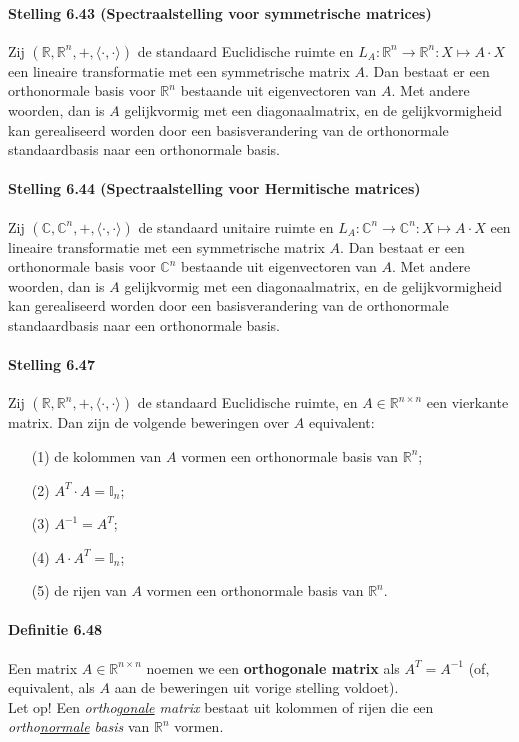 \documentclass[11pt,oneside,a4paper]{article}
\begin{document}
	\paragraph{Stelling 6.43 (Spectraalstelling voor symmetrische matrices)}
		Zij $(\mathbb{R},\mathbb{R}^n,+, \langle \cdot , \cdot \rangle)$ de standaard Euclidische ruimte en $L_A: \mathbb{R}^n \to \mathbb{R}^n: X \mapsto A \cdot X$ een lineaire transformatie met een symmetrische matrix $A$. Dan bestaat er een orthonormale basis voor $\mathbb{R}^n$ bestaande uit eigenvectoren van $A$. Met andere woorden, dan is $A$ gelijkvormig met een diagonaalmatrix, en de gelijkvormigheid kan gerealiseerd worden door een basisverandering van de orthonormale standaardbasis naar een orthonormale basis.
	\paragraph{Stelling 6.44 (Spectraalstelling voor Hermitische matrices)}
		Zij \newline $(\mathbb{C},\mathbb{C}^n,+, \langle \cdot , \cdot \rangle)$ de standaard unitaire ruimte en $L_A: \mathbb{C}^n \to \mathbb{C}^n: X \mapsto A \cdot X$ een lineaire transformatie met een symmetrische matrix $A$. Dan bestaat er een orthonormale basis voor $\mathbb{C}^n$ bestaande uit eigenvectoren van $A$. Met andere woorden, dan is $A$ gelijkvormig met een diagonaalmatrix, en de gelijkvormigheid kan gerealiseerd worden door een basisverandering van de orthonormale standaardbasis naar een orthonormale basis.
	\paragraph{Stelling 6.47}	
		Zij $(\mathbb{R},\mathbb{R}^n,+, \langle \cdot , \cdot \rangle)$ de standaard Euclidische ruimte, en $A \in \mathbb{R}^{n\times n}$ een vierkante matrix. Dan zijn de volgende beweringen over $A$ equivalent:
		\begin{itemize}
			\item[(1)] de kolommen van $A$ vormen een orthonormale basis van $\mathbb{R}^n$;
			\item[(2)] $A^T \cdot A = \mathbb{I}_n$;
			\item[(3)] $A^{-1}= A^T$;
			\item[(4)] $A \cdot A^T = \mathbb{I}_n$;
			\item[(5)] de rijen van $A$ vormen een orthonormale basis van $\mathbb{R}^n$.
		\end{itemize}
	\paragraph{Definitie 6.48}	
		Een matrix $A \in \mathbb{R}^{n\times n}$ noemen we een \textbf{orthogonale matrix} als $A^T= A^{-1}$ (of, equivalent, als $A$ aan de beweringen uit vorige stelling voldoet). \\ Let op! Een \textit{ortho\underline{gonale} matrix} bestaat uit kolommen of rijen die een \textit{ortho\underline{normale} basis} van $\mathbb{R}^n$ vormen.
\end{document}
